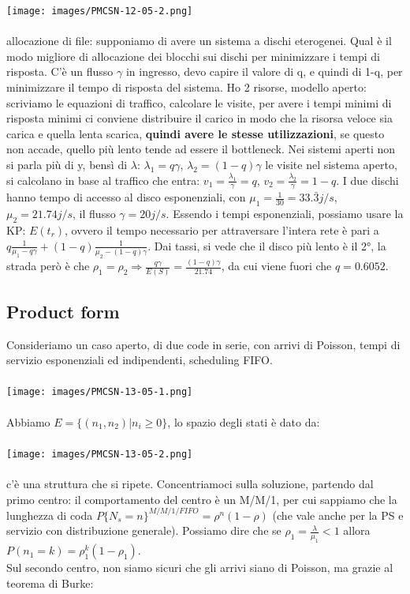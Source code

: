\documentclass{article}
\begin{document}
\texttt{[image: images/PMCSN-12-05-2.png]}\\\\
allocazione di file: supponiamo di avere un sistema a dischi eterogenei. Qual è il modo migliore di allocazione dei blocchi sui dischi per minimizzare i tempi di risposta. C'è un flusso $\gamma$ in ingresso, devo capire il valore di q, e quindi di 1-q, per minimizzare il tempo di risposta del sistema. Ho 2 risorse, modello aperto: scriviamo le equazioni di traffico, calcolare le visite, per avere i tempi minimi di risposta minimi ci conviene distribuire il carico in modo che la risorsa veloce sia carica e quella lenta scarica, \textbf{quindi avere le stesse utilizzazioni}, se questo non accade, quello più lento tende ad essere il bottleneck. Nei sistemi aperti non si parla più di y, bensì di $\lambda$: $\lambda_1 = q \gamma$, $\lambda_2 = (1-q) \gamma$ 
le visite nel sistema aperto, si calcolano in base al traffico che entra: $v_1 = \frac{\lambda_1}{\gamma} = q$, $v_2 = \frac{\lambda_2}{\gamma} = 1-q$. I due dischi hanno tempo di accesso al disco esponenziali, con $\mu_1 = \frac{1}{30} = 33.\bar{3}j/s$, $\mu_2 = 21.74 j/s$, il flusso $\gamma = 20 j/s$. Essendo i tempi esponenziali, possiamo usare la KP: $E(t_r)$, ovvero il tempo necessario per attraversare l'intera rete è pari a $q \frac{1}{\mu_1 - q\gamma} + (1-q) \frac{1}{\mu_2 - (1-q)\gamma}$. Dai tassi, si vede che il disco più lento è il 2°, la strada però è che $\rho_1 = \rho_2 \Rightarrow \frac{q\gamma}{E(S)} = \frac{(1-q)\gamma}{21.74}$, da cui viene fuori che $q = 0.6052$.
\subsection{Product form}
Consideriamo un caso aperto, di due code in serie, con arrivi di Poisson, tempi di servizio esponenziali ed indipendenti, scheduling FIFO.\\\\
\texttt{[image: images/PMCSN-13-05-1.png]}\\\\
Abbiamo $E = \{(n_1, n_2) | n_i \geq 0\}$, lo spazio degli stati è dato da:\\\\
\texttt{[image: images/PMCSN-13-05-2.png]} \\\\
c'è una struttura che si ripete. Concentriamoci sulla soluzione, partendo dal primo centro: il comportamento del centro è un M/M/1, per cui sappiamo che la lunghezza di coda $P\{ N_s = n\}^{M/M/1/FIFO} = \rho^n(1-\rho)$ (che vale anche per la PS e servizio con distribuzione generale). Possiamo dire che se $\rho_1 = \frac{\lambda}{\mu_1} < 1$ allora $P(n_1 = k) = \rho_1^k (1 - \rho_1)$. \\ Sul secondo centro, non siamo sicuri che gli arrivi siano di Poisson, ma grazie al teorema di Burke:
\end{document}
